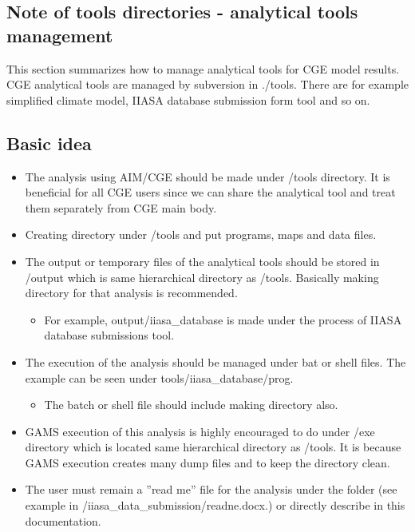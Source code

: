 \documentclass[10pt,a4paper,titlepage,dvipdfmx]{book}
\begin{document}
\begin{itemize}
\section{\label{sec:NotTooDir}Note of tools directories - analytical tools management}

This section summarizes how to manage analytical tools for CGE model results. CGE analytical tools are managed by subversion in ./tools. There are for example simplified climate model, IIASA database submission form tool and so on.

\subsection{\label{subsec:BasIde}Basic idea}


\begin{itemize}
\item The analysis using AIM/CGE should be made under /tools directory. It is beneficial for all CGE users since we can share the analytical tool and treat them separately from CGE main body.
\item Creating directory under /tools and put programs, maps and data files.
\item The output or temporary files of the analytical tools should be stored in /output which is same hierarchical directory as /tools. Basically making directory for that analysis is recommended.
\begin{itemize}
\item For example, output/iiasa\_database is made under the process of IIASA database submissions tool.
\end{itemize}

\item The execution of the analysis should be managed under bat or shell files. The example can be seen under tools/iiasa\_database/prog.
\begin{itemize}
\item The batch or shell file should include making directory also.
\end{itemize}

\item GAMS execution of this analysis is highly encouraged to do under /exe directory which is located same hierarchical directory as /tools. It is because GAMS execution creates many dump files and to keep the directory clean.
\item The user must remain a ''read me'' file for the analysis under the folder (see example in /iiasa\_data\_submission/readne.docx.)  or directly describe in this documentation. 
\end{itemize}

\end{itemize}
\end{document}
